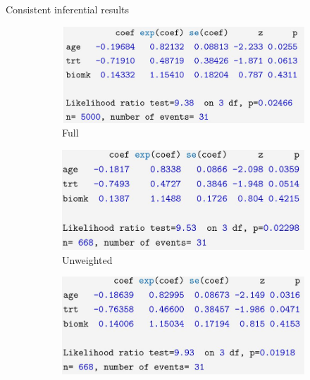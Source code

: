 \documentclass{beamer}
\begin{document}
\begin{frame}{Consistent inferential results}


    \begin{figure}
	\centering
	\begin{subfigure}{0.47\textwidth}
		\includegraphics[width=\textwidth]{fit.jpg}
		\caption{Full}
	\end{subfigure}
	\begin{subfigure}{0.47\textwidth}
		\includegraphics[width=\textwidth]{fituw.jpg}
		\caption{Unweighted}
	\end{subfigure}
    \begin{subfigure}{0.47\textwidth}
		\includegraphics[width=\textwidth]{fitw.jpg}

\end{subfigure}
\end{figure}
\end{frame}
\end{document}

